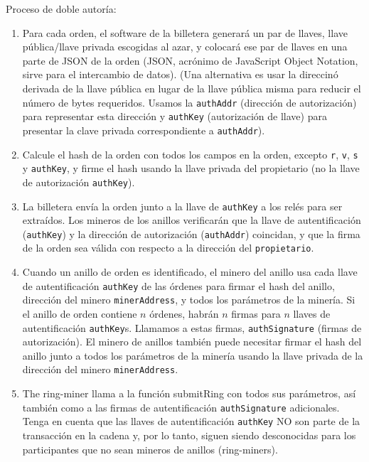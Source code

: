 \documentclass[UTF8,nofonts]{article}
\begin{document}
\begin{multicols}{2}
Proceso de doble autor\'ia:
\begin{enumerate}
	\item Para cada orden, el software de la billetera generar\'a un par de llaves, llave p\'ublica/llave privada escogidas al azar, y colocar\'a ese par de llaves en una parte de JSON de la orden (JSON, acr\'onimo de JavaScript Object Notation, sirve para el intercambio de datos). (Una alternativa es usar la direccin\'o derivada de la llave p\'ublica en lugar de la llave p\'ublica misma para reducir el n\'umero de bytes requeridos. Usamos la \verb|authAddr| (direcci\'on de autorizaci\'on) para representar esta direcci\'on y \verb|authKey| (autorizaci\'on de llave) para presentar la clave privada correspondiente a \verb|authAddr|).
    \item Calcule el hash de la orden con todos los campos en la orden, excepto \verb|r|, \verb|v|, \verb|s| y \verb|authKey|, y firme el hash usando la llave privada del propietario (no la llave de autorizaci\'on \verb|authKey|).

    \item La billetera env\'ia la orden junto a la llave de \verb|authKey| a los rel\'es para ser extra\'idos. Los mineros de los anillos verificar\'an que la llave de autentificaci\'on (\verb|authKey|) y la direcci\'on de autorizaci\'on (\verb|authAddr|) coincidan, y que la firma de la orden sea v\'alida con respecto a la direcci\'on del \verb|propietario|. %


	\item Cuando un anillo de orden es identificado, el minero del anillo usa cada llave de autentificaci\'on \verb|authKey| de las \'ordenes para firmar el hash del anillo, direcci\'on del minero \verb|minerAddress|, y todos los par\'ametros de la miner\'ia. Si el anillo de orden contiene $n$ \'ordenes, habr\'an $n$ firmas para $n$ llaves de autentificaci\'on \verb|authKey|s. Llamamos a estas firmas, \verb|authSignature| (firmas de autorizaci\'on). El minero de anillos tambi\'en puede necesitar firmar el hash del anillo junto a todos los par\'ametros de la miner\'ia usando la llave privada de la direcci\'on del minero  \verb|minerAddress|.
	\item The ring-miner llama a la funci\'on submitRing con todos sus par\'ametros, as\'i tambi\'en como a las firmas de autentificaci\'on \verb|authSignature| adicionales. Tenga en cuenta que las llaves de autentificaci\'on \verb|authKey| NO son parte de la transacci\'on en la cadena y, por lo tanto, siguen siendo desconocidas para los participantes que no sean mineros de anillos (ring-miners).


\end{enumerate}
\end{multicols}
\end{document}

